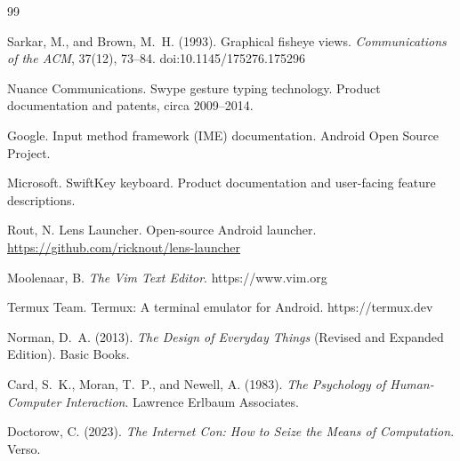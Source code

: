 \documentclass[11pt]{article}
\begin{document}
\newpage
\begin{thebibliography}{99}

Sarkar, M., and Brown, M.~H. (1993).
\newblock Graphical fisheye views.
\newblock \emph{Communications of the ACM}, 37(12), 73--84.
\newblock doi:10.1145/175276.175296

Nuance Communications.
\newblock Swype gesture typing technology.
\newblock Product documentation and patents, circa 2009--2014.

Google.
\newblock Input method framework (IME) documentation.
\newblock Android Open Source Project.

Microsoft.
\newblock SwiftKey keyboard.
\newblock Product documentation and user-facing feature descriptions.

Rout, N.
\newblock Lens Launcher.
\newblock Open-source Android launcher.
\newblock \url{https://github.com/ricknout/lens-launcher}

Moolenaar, B.
\newblock \emph{The Vim Text Editor}.
\newblock https://www.vim.org

Termux Team.
\newblock Termux: A terminal emulator for Android.
\newblock https://termux.dev

Norman, D.~A. (2013).
\newblock \emph{The Design of Everyday Things} (Revised and Expanded Edition).
\newblock Basic Books.

Card, S.~K., Moran, T.~P., and Newell, A. (1983).
\newblock \emph{The Psychology of Human-Computer Interaction}.
\newblock Lawrence Erlbaum Associates.

Doctorow, C. (2023).
\newblock \emph{The Internet Con: How to Seize the Means of Computation}.
\newblock Verso.

\end{thebibliography}
\end{document}
